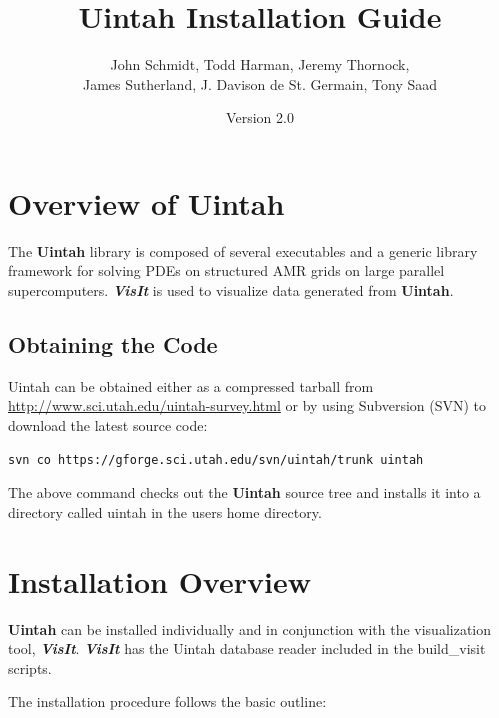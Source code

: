 \documentclass[12pt]{article}
\begin{document}
\title{Uintah Installation Guide}

\author{John Schmidt, Todd Harman, Jeremy Thornock, \\
  James Sutherland, J. Davison de St. Germain, Tony Saad}

\date{Version 2.0}

\maketitle



\newpage

\tableofcontents

\newpage

\section{Overview of Uintah} \label{sec:overview} The \textbf{Uintah}
library is composed of several executables and a generic library
framework for solving PDEs on structured AMR grids on large parallel
supercomputers. \textbf{\emph{VisIt}} is used to visualize data
generated from \textbf{Uintah}.

\subsection{Obtaining the Code}
Uintah can be obtained either as a compressed tarball from
\url{http://www.sci.utah.edu/uintah-survey.html} or by
using Subversion (SVN) to download the latest source code:

\begin{verbatim}
svn co https://gforge.sci.utah.edu/svn/uintah/trunk uintah
\end{verbatim}

The above command checks out the \textbf{Uintah} source tree and
installs it into a directory called uintah in the users home
directory.


\section{Installation Overview}

\textbf{Uintah} can be installed individually and in conjunction with
the visualization tool, \textbf{\emph{VisIt}}.  \textbf{\emph{VisIt}}
has the Uintah database reader included in the build\_visit scripts.

The installation procedure follows the basic outline:
\end{document}
